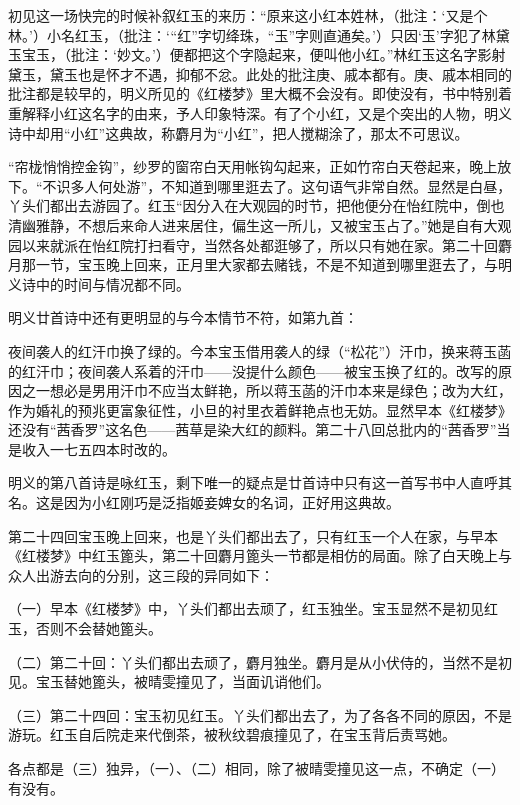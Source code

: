 \par 初见这一场快完的时候补叙红玉的来历：“原来这小红本姓林，（批注：‘又是个林。'）小名红玉，（批注：‘“红”字切绛珠，“玉”字则直通矣。'）只因‘玉’字犯了林黛玉宝玉，（批注：‘妙文。'）便都把这个字隐起来，便叫他小红。”林红玉这名字影射黛玉，黛玉也是怀才不遇，抑郁不忿。此处的批注庚、戚本都有。庚、戚本相同的批注都是较早的，明义所见的《红楼梦》里大概不会没有。即使没有，书中特别着重解释小红这名字的由来，予人印象特深。有了个小红，又是个突出的人物，明义诗中却用“小红”这典故，称麝月为“小红”，把人搅糊涂了，那太不可思议。
\par “帘栊悄悄控金钩”，纱罗的窗帘白天用帐钩勾起来，正如竹帘白天卷起来，晚上放下。“不识多人何处游”，不知道到哪里逛去了。这句语气非常自然。显然是白昼，丫头们都出去游园了。红玉“因分入在大观园的时节，把他便分在怡红院中，倒也清幽雅静，不想后来命人进来居住，偏生这一所儿，又被宝玉占了。”她是自有大观园以来就派在怡红院打扫看守，当然各处都逛够了，所以只有她在家。第二十回麝月那一节，宝玉晚上回来，正月里大家都去赌钱，不是不知道到哪里逛去了，与明义诗中的时间与情况都不同。
\par 明义廿首诗中还有更明显的与今本情节不符，如第九首：
\par 夜间袭人的红汗巾换了绿的。今本宝玉借用袭人的绿（“松花”）汗巾，换来蒋玉菡的红汗巾；夜间袭人系着的汗巾——没提什么颜色——被宝玉换了红的。改写的原因之一想必是男用汗巾不应当太鲜艳，所以蒋玉菡的汗巾本来是绿色；改为大红，作为婚礼的预兆更富象征性，小旦的衬里衣着鲜艳点也无妨。显然早本《红楼梦》还没有“茜香罗”这名色——茜草是染大红的颜料。第二十八回总批内的“茜香罗”当是收入一七五四本时改的。
\par 明义的第八首诗是咏红玉，剩下唯一的疑点是廿首诗中只有这一首写书中人直呼其名。这是因为小红刚巧是泛指姬妾婢女的名词，正好用这典故。
\par 第二十四回宝玉晚上回来，也是丫头们都出去了，只有红玉一个人在家，与早本《红楼梦》中红玉篦头，第二十回麝月篦头一节都是相仿的局面。除了白天晚上与众人出游去向的分别，这三段的异同如下：
\par （一）早本《红楼梦》中，丫头们都出去顽了，红玉独坐。宝玉显然不是初见红玉，否则不会替她篦头。
\par （二）第二十回：丫头们都出去顽了，麝月独坐。麝月是从小伏侍的，当然不是初见。宝玉替她篦头，被晴雯撞见了，当面讥诮他们。
\par （三）第二十四回：宝玉初见红玉。丫头们都出去了，为了各各不同的原因，不是游玩。红玉自后院走来代倒茶，被秋纹碧痕撞见了，在宝玉背后责骂她。
\par 各点都是（三）独异，（一）、（二）相同，除了被晴雯撞见这一点，不确定（一）有没有。
